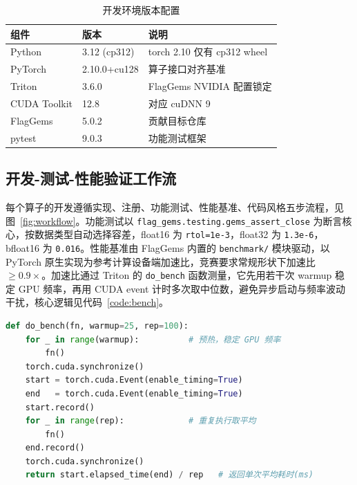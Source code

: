 \begin{table}[!htbp]
\centering\small
\caption{开发环境版本配置}
\label{tab:env}
\renewcommand{\arraystretch}{1.1}
\begin{tabular}{lll}
\toprule
组件 & 版本 & 说明 \\
\midrule
Python & 3.12 (cp312) & torch 2.10 仅有 cp312 wheel \\
PyTorch & 2.10.0+cu128 & 算子接口对齐基准 \\
Triton & 3.6.0 & FlagGems NVIDIA 配置锁定 \\
CUDA Toolkit & 12.8 & 对应 cuDNN 9 \\
FlagGems & 5.0.2 & 贡献目标仓库 \\
pytest & 9.0.3 & 功能测试框架 \\
\bottomrule
\end{tabular}
\end{table}

\subsection{开发-测试-性能验证工作流}
每个算子的开发遵循实现、注册、功能测试、性能基准、代码风格五步流程，见图~\ref{fig:workflow}。功能测试以 \texttt{flag\_gems.testing.gems\_assert\_close} 为断言核心，按数据类型自动选择容差，float16 为 \texttt{rtol=1e-3}，float32 为 \texttt{1.3e-6}，bfloat16 为 \texttt{0.016}。性能基准由 FlagGems 内置的 \texttt{benchmark/} 模块驱动，以 PyTorch 原生实现为参考计算设备端加速比，竞赛要求常规形状下加速比 $\geqslant 0.9\times$。加速比通过 Triton 的 \texttt{do\_bench} 函数测量，它先用若干次 warmup 稳定 GPU 频率，再用 CUDA event 计时多次取中位数，避免异步启动与频率波动干扰，核心逻辑见代码~\ref{code:bench}。

\begin{lstlisting}[language=Python, caption={do\_bench 性能测量核心逻辑（Triton 标准）}, label={code:bench}]
def do_bench(fn, warmup=25, rep=100):
    for _ in range(warmup):          # 预热，稳定 GPU 频率
        fn()
    torch.cuda.synchronize()
    start = torch.cuda.Event(enable_timing=True)
    end   = torch.cuda.Event(enable_timing=True)
    start.record()
    for _ in range(rep):             # 重复执行取平均
        fn()
    end.record()
    torch.cuda.synchronize()
    return start.elapsed_time(end) / rep   # 返回单次平均耗时(ms)
\end{lstlisting}

